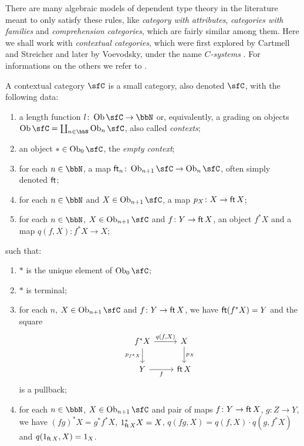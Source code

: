 \noindent
There are many algebraic models of dependent type theory in the literature meant
to only satisfy these rules, like
\emph{category with attributes}, \emph{categories with families} and
\emph{comprehension categories}, which are
fairly similar among them.
Here we shall work with \emph{contextual
categories}, which were first explored by Cartmell and Streicher
\cite{Car78,Car86,Str91} and later by Voevodsky, under the name
$C$\emph{-systems} \cite{Voe14a}. For informations on the
others we refer to \cite{nlab:categorical_model_of_dependent_types}.

\begin{defn}
  A contextual category $\sfC$ is a small category, also denoted $\sfC$,
  with the following data:
  \begin{enumerate}
    \item a length function $l\colon\Ob\sfC\rightarrow\bbN$ or, equivalently, a
      grading on objects $\Ob\sfC=\coprod_{n\in\bbN}\Ob_n\sfC$, also called
      \emph{contexts};
    \item an object $*\in\Ob_0\sfC$, the \emph{empty context};
    \item for each $n\in\bbN$, a map
      $\cft_n\colon\Ob_{n+1}\sfC\rightarrow\Ob_n\sfC$, often simply denoted
      $\operatorname{\mathsf{ft}}$;
    \item for each $n\in\bbN$ and $X\in\Ob_{n+1}\sfC$, a map $p_X\colon
      X\rightarrow\operatorname{\mathsf{ft}} X$;
    \item for each $n\in\bbN$, $X\in\Ob_{n+1}\sfC$ and $f\colon Y\rightarrow
      \operatorname{\mathsf{ft}} X$, an object $f^*X$ and a map $q(f,X)\colon f^*X\rightarrow X$;
  \end{enumerate}
  such that:
  \begin{enumerate}
    \item $*$ is the unique element of $\Ob_0\sfC$;
    \item $*$ is terminal;
    \item for each $n$, $X\in\Ob_{n+1}\sfC$ and $f\colon Y\rightarrow \operatorname{\mathsf{ft}} X$, we
      have $\operatorname{\mathsf{ft}}(f^*X)=Y$ and the square
      \[\begin{tikzcd}
        {f^*X} & X \\
        Y & \cft X
        \arrow["f"', from=2-1, to=2-2]
        \arrow["{p_X}", from=1-2, to=2-2]
        \arrow["{q(f,X)}", from=1-1, to=1-2]
        \arrow["{p_{f^*X}}"', from=1-1, to=2-1]
      \end{tikzcd}\]
      is a pullback;
    \item for each $n\in\bbN$, $X\in\Ob_{n+1}\sfC$ and pair of maps $f\colon
      Y\rightarrow \operatorname{\mathsf{ft}} X$, $g\colon Z\rightarrow Y$, we have $(fg)^*X=g^*f^*X$,
      $1^*_{\operatorname{\mathsf{ft}} X}X=X$, $q(fg,X)=q(f,X)\cdot q(g,f^*X)$ and $q(1_{\operatorname{\mathsf{ft}} X},X)=1_X$.
  \end{enumerate}
\end{defn}

